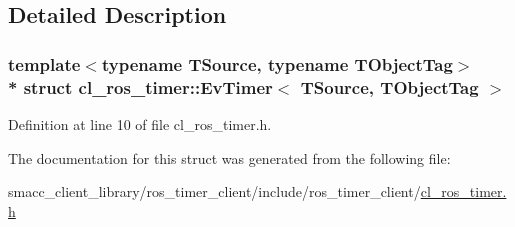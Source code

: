 \subsection{Detailed Description}
\subsubsection*{template$<$typename T\+Source, typename T\+Object\+Tag$>$\\*
struct cl\+\_\+ros\+\_\+timer\+::\+Ev\+Timer$<$ T\+Source, T\+Object\+Tag $>$}



Definition at line 10 of file cl\+\_\+ros\+\_\+timer.\+h.



The documentation for this struct was generated from the following file\+:\begin{DoxyCompactItemize}
\item 
smacc\+\_\+client\+\_\+library/ros\+\_\+timer\+\_\+client/include/ros\+\_\+timer\+\_\+client/\hyperlink{cl__ros__timer_8h}{cl\+\_\+ros\+\_\+timer.\+h}\end{DoxyCompactItemize}
